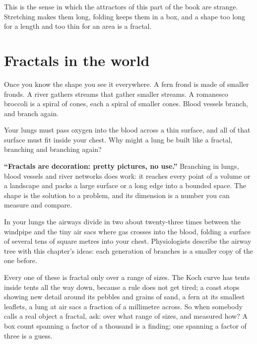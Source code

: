 This is the sense in which the attractors of this part of the book are
strange. Stretching makes them long, folding keeps them in a box, and a
shape too long for a length and too thin for an area is a fractal.

\section{Fractals in the world}
\label{sec:ch11-world}

\noindent
Once you know the shape you see it everywhere. A fern frond is made of
smaller fronds. A river gathers streams that gather smaller streams. A
romanesco broccoli is a spiral of cones, each a spiral of smaller cones.
Blood vessels branch, and branch again.

\begin{think}
Your lungs must pass oxygen into the blood across a thin surface, and all of
that surface must fit inside your chest. Why might a lung be built like a
fractal, branching and branching again?
\end{think}

\begin{trapbox}
\textbf{\enquote{Fractals are decoration: pretty pictures, no use.}} Branching
in lungs, blood vessels and river networks does work: it reaches every point
of a volume or a landscape and packs a large surface or a long edge into a
bounded space. The shape is the solution to a problem, and its dimension is a
number you can measure and compare.
\end{trapbox}

\begin{worldbox}
In your lungs the airways divide in two about twenty-three times between the
windpipe and the tiny air sacs where gas crosses into the blood, folding a
surface of several tens of square metres into your chest. Physiologists
describe the airway tree with this chapter's ideas: each generation of
branches is a smaller copy of the one before.
\end{worldbox}

\noindent
Every one of these is fractal only over a range of sizes. The Koch curve has
tents inside tents all the way down, because a rule does not get tired; a
coast stops showing new detail around its pebbles and grains of sand, a fern
at its smallest leaflets, a lung at air sacs a fraction of a millimetre
across. So when somebody calls a real object a fractal, ask: over what range
of sizes, and measured how? A box count spanning a factor of a thousand is a
finding; one spanning a factor of three is a guess.

